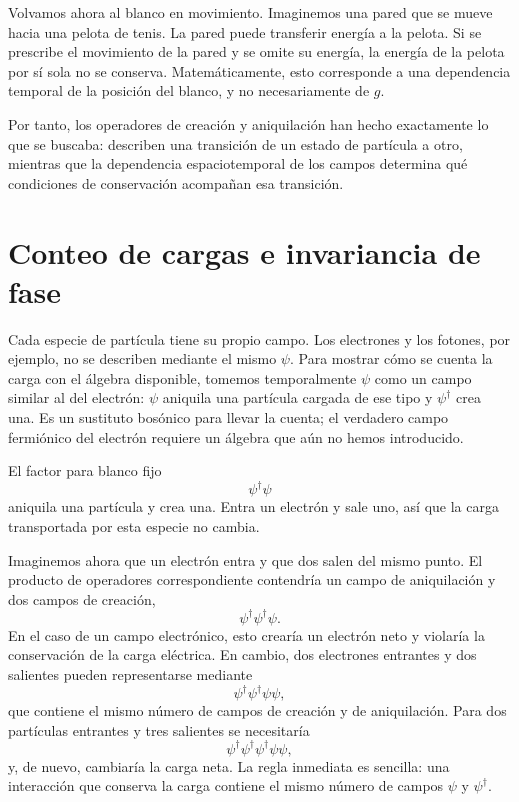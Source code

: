 Volvamos ahora al blanco en movimiento. Imaginemos una pared que se mueve hacia una pelota de tenis. La pared puede transferir energía a la pelota. Si se prescribe el movimiento de la pared y se omite su energía, la energía de la pelota por sí sola no se conserva. Matemáticamente, esto corresponde a una dependencia temporal de la posición del blanco, y no necesariamente de \(g\).

Por tanto, los operadores de creación y aniquilación han hecho exactamente lo que se buscaba: describen una transición de un estado de partícula a otro, mientras que la dependencia espaciotemporal de los campos determina qué condiciones de conservación acompañan esa transición.

\section{Conteo de cargas e invariancia de fase}

Cada especie de partícula tiene su propio campo. Los electrones y los fotones, por ejemplo, no se describen mediante el mismo \(\psi\). Para mostrar cómo se cuenta la carga con el álgebra disponible, tomemos temporalmente \(\psi\) como un campo similar al del electrón: \(\psi\) aniquila una partícula cargada de ese tipo y \(\psi^\dagger\) crea una. Es un sustituto bosónico para llevar la cuenta; el verdadero campo fermiónico del electrón requiere un álgebra que aún no hemos introducido.

El factor para blanco fijo
\begin{equation}
\psi^\dagger\psi
\end{equation}
aniquila una partícula y crea una. Entra un electrón y sale uno, así que la carga transportada por esta especie no cambia.

Imaginemos ahora que un electrón entra y que dos salen del mismo punto. El producto de operadores correspondiente contendría un campo de aniquilación y dos campos de creación,
\begin{equation}
\psi^\dagger\psi^\dagger\psi.
\end{equation}
En el caso de un campo electrónico, esto crearía un electrón neto y violaría la conservación de la carga eléctrica. En cambio, dos electrones entrantes y dos salientes pueden representarse mediante
\begin{equation}
\psi^\dagger\psi^\dagger\psi\psi,
\end{equation}
que contiene el mismo número de campos de creación y de aniquilación. Para dos partículas entrantes y tres salientes se necesitaría
\begin{equation}
\psi^\dagger\psi^\dagger\psi^\dagger\psi\psi,
\end{equation}
y, de nuevo, cambiaría la carga neta. La regla inmediata es sencilla: una interacción que conserva la carga contiene el mismo número de campos \(\psi\) y \(\psi^\dagger\).

